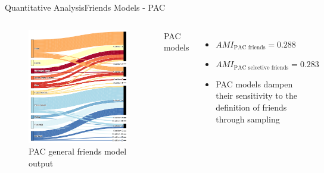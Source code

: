 \documentclass[xcolor=dvipsnames]{beamer}
\newcommand{\AMI}{\mathit{AMI}}
\begin{document}
\begin{frame}{Quantitative Analysis}{Friends Models - PAC}
  \small
  \begin{columns}
  \begin{figure}
    \includegraphics[width=\linewidth]{friends_pac}
    \caption{PAC general friends model output}
  \end{figure}
  PAC models
  \begin{itemize}
    \item $\AMI_{\text{PAC friends}} = 0.288$
    \item $\AMI_{\text{PAC selective friends}} = 0.283$
    \item PAC models dampen their sensitivity to the definition of friends through sampling
  \end{itemize}
  \end{columns}
\end{frame}
\end{document}
